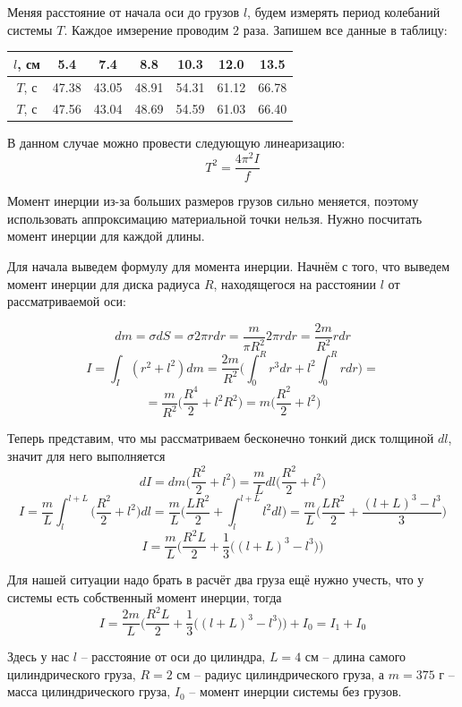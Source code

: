 \documentclass[12pt, a4paper]{article}
\begin{document}
Меняя расстояние от начала оси до грузов $l$, будем измерять период колебаний системы $T$. Каждое имзерение проводим $2$ раза. Запишем все данные в таблицу:

\begin{center}
\begin{tabular}{|c|c|c|c|c|c|c|}
\hline 
$l$, см & 5.4 & 7.4 & 8.8 & 10.3 & 12.0 & 13.5 \\ 
\hline 
$T$, с & 47.38 & 43.05 & 48.91 & 54.31 & 61.12 & 66.78 \\ 
\hline 
$T$, с & 47.56 & 43.04 & 48.69 & 54.59 & 61.03 & 66.40 \\ 
\hline 
\end{tabular}
\end{center} 

В данном случае можно провести следующую линеаризацию:
\[T^2 = \frac{4\pi^2 I}{f}\]

Момент инерции из-за больших размеров грузов сильно меняется, поэтому использовать аппроксимацию материальной точки нельзя. Нужно посчитать момент инерции для каждой длины. 

Для начала выведем формулу для момента инерции. Начнём с того, что выведем момент инерции для диска радиуса $R$, находящегося на расстоянии $l$ от рассматриваемой оси:

\[dm = \sigma dS = \sigma 2\pi r dr = \frac{m}{\pi R^2} 2\pi r dr = \frac{2m}{R^2} r dr\]
\[I = \int_{I} (r^2 + l^2) dm = \frac{2m}{R^2}\Big(\int_{0}^{R} r^3 dr + l^2\int_{0}^{R} r dr \Big) = \]
\[= \frac{m}{R^2}\Big(\frac{R^4}{2} + l^2 R^2 \Big) = m\Big(\frac{R^2}{2} + l^2 \Big)\]

Теперь представим, что мы рассматриваем бесконечно тонкий диск толщиной $dl$, значит для него выполняется
\[dI = dm\Big(\frac{R^2}{2} + l^2 \Big) = \frac{m}{L} dl\Big(\frac{R^2}{2} + l^2 \Big) \]
\[I = \frac{m}{L} \int_{l}^{l+L} \Big(\frac{R^2}{2} + l^2 \Big) dl = \frac{m}{L} \Big(\frac{L R^2}{2} + \int_{l}^{l+L} l^2 dl \Big) = \frac{m}{L} \Big(\frac{L R^2}{2} + \frac{(l+L)^3 - l^3}{3} \Big) \]
\[I = \frac{m}{L}\Big(\frac{R^2 L}{2} + \frac{1}{3}\big((l + L)^3 - l^3\big)\big)\]

Для нашей ситуации надо брать в расчёт два груза  ещё нужно учесть, что у системы есть собственный момент инерции, тогда
\[I = \frac{2m}{L}\Big(\frac{R^2 L}{2} + \frac{1}{3}\big((l + L)^3 - l^3\big)\big) +  I_0 = I_1 + I_0\]

Здесь у нас $l$ -- расстояние от оси до цилиндра, $L = 4$ см -- длина самого цилиндрического груза, $R = 2$ см -- радиус цилиндрического груза, а $m = 375$ г -- масса цилиндрического груза, $I_0$ -- момент инерции системы без грузов.
\end{document}
